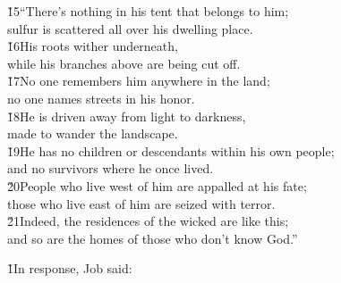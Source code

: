 \begin{poetry}
\poeml \v{15}``There's nothing in his tent that belongs to him; \\
\poemll    sulfur is scattered all over his dwelling place. \\
\poeml \v{16}His roots wither underneath, \\
\poemll    while his branches above are being cut off. \\
\poeml \v{17}No one remembers him anywhere in the land; \\
\poemll    no one names streets in his honor. \\
\poeml \v{18}He is driven away from light to darkness, \\
\poemll    made to wander the landscape. \\
\poeml \v{19}He has no children or descendants within his own people; \\
\poemll    and no survivors where he once lived. \\
\poeml \v{20}People who live west of him are appalled at his fate; \\
\poemll    those who live east of him are seized with terror. \\
\poeml \v{21}Indeed, the residences of the wicked are like this; \\
\poemll    and so are the homes of those who don't know God.''
\end{poetry}

\v{1}In response, Job said:

